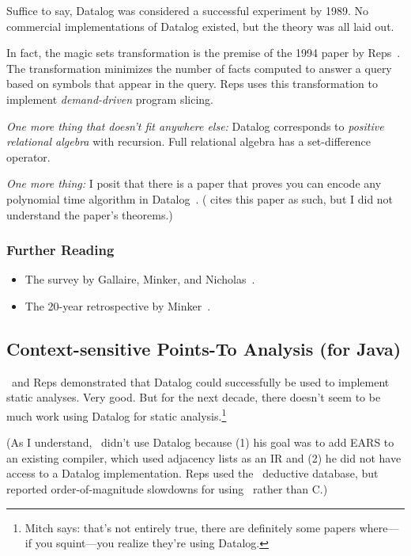 \documentclass{article}
\begin{document}
Suffice to say, Datalog was considered a successful experiment by 1989.
No commercial implementations of Datalog existed, but the theory was all laid out.

In fact, the magic sets transformation is the premise of the 1994 paper by Reps~\cite{r-ald-1994}.
The transformation minimizes the number of facts computed to answer a query based on symbols that appear in the query.
Reps uses this transformation to implement \emph{demand-driven} program slicing.

\emph{One more thing that doesn't fit anywhere else:} Datalog corresponds to \emph{positive relational algebra} with recursion.
Full relational algebra has a set-difference operator.

\emph{One more thing:} I posit that there is a paper that proves you can encode any polynomial time algorithm in Datalog~\cite{degv-csur-2001}.
(\flix{} cites this paper as such, but I did not understand the paper's theorems.)

\subsubsection*{Further Reading}
\begin{itemize}
\item The survey by Gallaire, Minker, and Nicholas~\cite{gmn-csur-1984}.
\item The 20-year retrospective by Minker~\cite{m-lfca-1999}.
\end{itemize}


\subsection*{Context-sensitive Points-To Analysis (for Java)}

\assmann\ and Reps demonstrated that Datalog could successfully be used to implement static analyses.
Very good.
But for the next decade, there doesn't seem to be much work using Datalog for static analysis.\footnote{Mitch says: that's not entirely true, there are definitely some papers where---if you squint---you realize they're using Datalog.}

(As I understand, \assmann\ didn't use Datalog because (1) his goal was to add EARS to an existing compiler, which used adjacency lists as an IR and (2) he did not have access to a Datalog implementation.
Reps used the \coral\ deductive database, but reported order-of-magnitude slowdowns for using \coral\ rather than C.)
\end{document}
